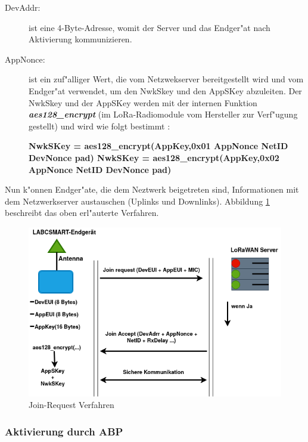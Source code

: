 \begin{description}
	\item[DevAddr:] ist eine 4-Byte-Adresse, womit der Server und das 
	Endger"at nach Aktivierung kommunizieren.   
	
	\item[AppNonce:] ist ein zuf"alliger Wert, die vom Netzwekserver 
	bereitgestellt wird und vom 
	Endger"at verwendet, um den NwkSkey und den AppSKey abzuleiten.
	Der NwkSkey und der AppSKey werden mit der internen Funktion   
	\textbf{\textit{aes128\_encrypt}} (im LoRa-Radiomodule vom 
	Hersteller zur Verf"ugung gestellt) und wird wie folgt bestimmt 
	\cite{LoRaWAN}:
	
	\textbf{NwkSKey = aes128\_encrypt(AppKey,0x01 \textbar AppNonce 
	\textbar NetID \textbar DevNonce \textbar pad)
	NwkSKey = aes128\_encrypt(AppKey,0x02 \textbar AppNonce \textbar 
	NetID \textbar DevNonce \textbar pad)} 
\end{description}

Nun k"onnen Endger"ate, die dem Neztwerk beigetreten sind, Informationen 
mit dem Netzwerkserver austauschen (Uplinks und Downlinks). Abbildung 
\ref{fig:request} beschreibt das oben erl"auterte Verfahren.


\begin{figure}[h]
	\centering
	\includegraphics[width=14cm]{source/images/Join-Procedure}
	\caption{Join-Request Verfahren\label{fig:request}}
\end{figure}


\vspace{10cm}
\subsubsection{Aktivierung durch ABP}

